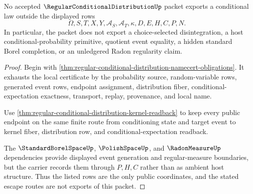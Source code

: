\begin{theorem}
\label{thm:regular-conditional-distribution-ledger-nonescape}
No accepted $\RegularConditionalDistributionUp$ packet exports a conditional law outside the displayed rows
$$
\Omega,S,T,X,Y,\mathcal{A}_S,\mathcal{A}_T,\kappa,D,E,H,C,P,N.
$$
In particular, the packet does not export a choice-selected disintegration, a host conditional-probability primitive, quotient event equality, a hidden standard Borel completion, or an unledgered Radon regularity claim.
\end{theorem}
\begin{proof}
Begin with \autoref{thm:regular-conditional-distribution-namecert-obligations}. It exhausts the local certificate by the probability source, random-variable rows, generated event rows, endpoint assignment, distribution fiber, conditional-expectation exactness, transport, replay, provenance, and local name.

Use \autoref{thm:regular-conditional-distribution-kernel-readback} to keep every public endpoint on the same finite route from conditioning state and target event to kernel fiber, distribution row, and conditional-expectation readback.

The $\StandardBorelSpaceUp$, $\PolishSpaceUp$, and $\RadonMeasureUp$ dependencies provide displayed event generation and regular-measure boundaries, but the carrier records them through $P,H,C$ rather than as ambient host structure. Thus the listed rows are the only public coordinates, and the stated escape routes are not exports of this packet.
\end{proof}


\begin{closurestatus}{\RegularConditionalDistributionUp}
  \theoryclosure{\seedClosure}
  \formalstatus{\unformalizedV}
\end{closurestatus}
